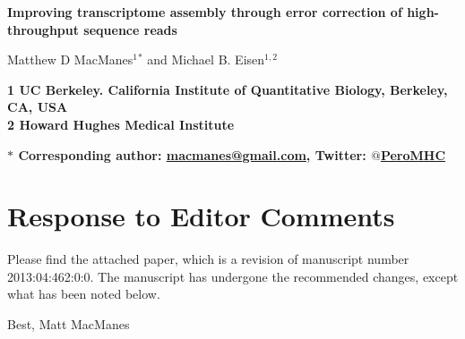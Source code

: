 \documentclass[11pt]{article}
\begin{document}
\begin{flushleft}


{\Large
\textbf{Improving transcriptome assembly through error correction of high-throughput sequence reads}
}
\\ 
\vspace{4mm}

\noindent
Matthew D MacManes$^{1}$$^\ast$ and
Michael B. Eisen$^{1,2}$ \\
\vspace{5mm}

\bf{1} \textnormal{UC Berkeley. California Institute of Quantitative Biology, Berkeley, CA, USA} \\
\bf{2} \textnormal{Howard Hughes Medical Institute} \\
\vspace{2mm}
 
\bf{$\ast$} \textnormal{Corresponding author: \href{mailto:macmanes@gmail.com}{macmanes@gmail.com}, Twitter: \href{https://twitter.com/PeroMHC}{$@$PeroMHC}}
\end{flushleft}
\vspace{4mm}



\section*{Response to Editor Comments}

\hspace{5mm} Please find the attached paper, which is a revision of manuscript number 2013:04:462:0:0. The manuscript has undergone the recommended changes, except what has been noted below. 

\noindent
Best, Matt MacManes 
\end{document}
